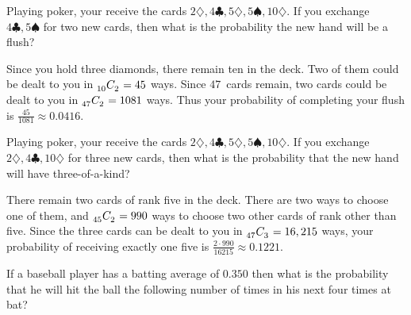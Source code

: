 \documentclass[answers,12pt]{exam}
\newcommand\ncr[2]{\tensor[_{#1}]C{_{#2}}}
\begin{document}
\begin{questions}

\question Playing poker, your receive the cards
$2\diamondsuit,4\clubsuit,5\diamondsuit,5\spadesuit,10\diamondsuit$.
If you exchange $4\clubsuit,5\spadesuit$ for two new cards,
then what is the probability the new hand will be a flush?
\begin{solution}
Since you hold three diamonds, there remain ten in the deck.
Two of them could be dealt to you in $\ncr{10}{2}=45$ ways.
Since $47$~cards remain, two cards could be dealt to you in
$\ncr{47}{2}=1081$ ways. Thus your probability of completing your flush
is $\frac{45}{1081}\approx 0.0416$.
\end{solution}

\question Playing poker, your receive the cards
$2\diamondsuit,4\clubsuit,5\diamondsuit,5\spadesuit,10\diamondsuit$.
If you exchange $2\diamondsuit,4\clubsuit,10\diamondsuit$ for
three new cards, then what is the probability that the new hand
will have three-of-a-kind?
\begin{solution}
There remain two cards of rank five in the deck. There are two
ways to choose one of them, and $\ncr{45}{2}=990$ ways to choose
two other cards of rank other than five. Since the three cards
can be dealt to you in $\ncr{47}{3}=16,215$ ways, your probability
of receiving exactly one five is $\frac{2\cdot 990}{16215}\approx 0.1221$.
\end{solution}
\question If a baseball player has a batting average
of $0.350$ then what is the probability that he
will hit the ball the following number of times in his next four
times at bat?


\end{questions}
\end{document}
